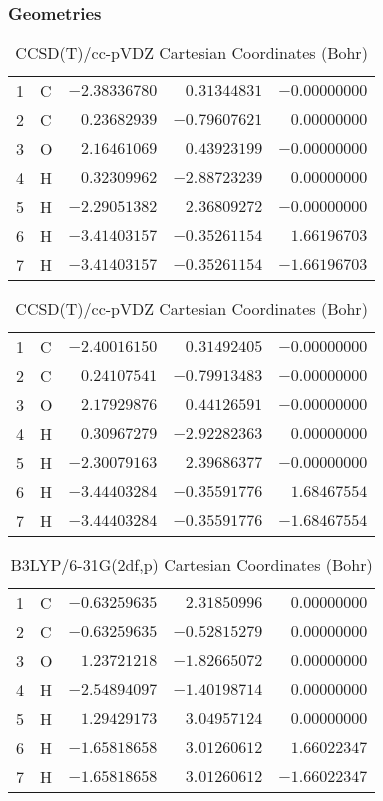 \documentclass[10pt,oneside]{article}
\begin{document}
\begin{table}[h!]
\subsubsection*{Geometries}
\begin{multicols}{2}
\centering
\caption{CCSD(T)/cc-pVTZ Cartesian Coordinates (Bohr)}
\begin{tabular}{llrrr}
\toprule
1  & C  & $-2.38336780$ & $ 0.31344831$ & $-0.00000000$ \\
2  & C  & $ 0.23682939$ & $-0.79607621$ & $ 0.00000000$ \\
3  & O  & $ 2.16461069$ & $ 0.43923199$ & $-0.00000000$ \\
4  & H  & $ 0.32309962$ & $-2.88723239$ & $ 0.00000000$ \\
5  & H  & $-2.29051382$ & $ 2.36809272$ & $-0.00000000$ \\
6  & H  & $-3.41403157$ & $-0.35261154$ & $ 1.66196703$ \\
7  & H  & $-3.41403157$ & $-0.35261154$ & $-1.66196703$ \\
\bottomrule
\end{tabular}
\caption{CCSD(T)/cc-pVDZ Cartesian Coordinates (Bohr)}
\begin{tabular}{llrrr}
\toprule
1  & C  & $-2.40016150$ & $ 0.31492405$ & $-0.00000000$ \\
2  & C  & $ 0.24107541$ & $-0.79913483$ & $-0.00000000$ \\
3  & O  & $ 2.17929876$ & $ 0.44126591$ & $-0.00000000$ \\
4  & H  & $ 0.30967279$ & $-2.92282363$ & $ 0.00000000$ \\
5  & H  & $-2.30079163$ & $ 2.39686377$ & $-0.00000000$ \\
6  & H  & $-3.44403284$ & $-0.35591776$ & $ 1.68467554$ \\
7  & H  & $-3.44403284$ & $-0.35591776$ & $-1.68467554$ \\
\bottomrule
\end{tabular}
\end{multicols}
\end{table}

\begin{table}[h]
\centering
\caption{B3LYP/6-31G(2df,p) Cartesian Coordinates (Bohr)}
\begin{tabular}{llrrr}
\toprule
1  & C  & $-0.63259635$ & $ 2.31850996$ & $ 0.00000000$ \\
2  & C  & $-0.63259635$ & $-0.52815279$ & $ 0.00000000$ \\
3  & O  & $ 1.23721218$ & $-1.82665072$ & $ 0.00000000$ \\
4  & H  & $-2.54894097$ & $-1.40198714$ & $ 0.00000000$ \\
5  & H  & $ 1.29429173$ & $ 3.04957124$ & $ 0.00000000$ \\
6  & H  & $-1.65818658$ & $ 3.01260612$ & $ 1.66022347$ \\
7  & H  & $-1.65818658$ & $ 3.01260612$ & $-1.66022347$ \\
\bottomrule
\end{tabular}
\end{table}
\end{document}
